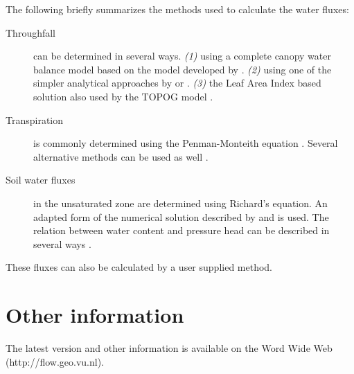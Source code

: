 \documentclass[twocolumn]{article}
\newcommand{\Index}[1]{#1\index{#1}}
\newcommand{\url}[1]{#1}
\begin{document}
The following briefly summarizes the methods used to
calculate the water fluxes:
\begin{description}
\item[Throughfall] can be determined in several ways. {\em (1)} using 
a complete canopy water balance model based on the model developed by
 . {\em (2)} using one of the simpler 
analytical approaches by   or
 .  {\em (3)} the Leaf Area Index based
solution also used by the TOPOG model \cite{vertessy1993140}.

\item[Transpiration] is commonly determined using the Penman-Monteith
equation \cite{monteith1965}. Several alternative methods can be used 
as well \cite{penman1956N,makkink1957,makkink1961,commissie1988N}.

\item[Soil water fluxes] in the unsaturated zone are determined using
Richard's equation. An adapted form of the numerical solution described
by    and   is used.
The relation between water content and pressure head can be
described in several ways 
\cite{genuchten1980179,mualem1976261,clapp1978263}.

\end{description}
These fluxes can also be calculated by a user supplied method.

\section*{Other information}

The latest version and other information is  available on the
\Index{Word Wide Web}
(\url{http://flow.geo.vu.nl}). 


\end{document}
